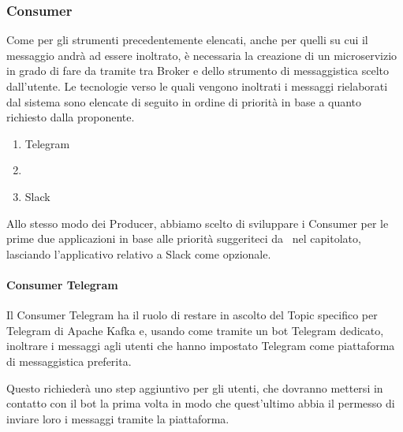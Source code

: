 
	\subsubsection{Consumer}\label{TecnologieConsumer}
		Come per gli strumenti precedentemente elencati, anche per quelli su cui il messaggio andrà ad essere inoltrato, è necessaria la creazione di un microservizio in grado di fare da tramite tra Broker e  dello strumento di messaggistica scelto dall'utente.
		Le tecnologie verso le quali vengono inoltrati i messaggi rielaborati dal sistema sono elencate di seguito in ordine di priorità in base a quanto richiesto dalla proponente.
		\begin{enumerate}
			\item Telegram
			\item \mail
			\item Slack
		\end{enumerate}
		Allo stesso modo dei Producer, abbiamo scelto di sviluppare i Consumer per le prime due applicazioni in base alle priorità suggeriteci da \II\ nel capitolato, lasciando l'applicativo relativo a Slack come opzionale.

		\paragraph{Consumer Telegram}
		Il Consumer Telegram ha il ruolo di restare in ascolto del Topic specifico
		per Telegram di Apache Kafka e, usando come tramite un bot Telegram dedicato, inoltrare i messaggi agli utenti che hanno impostato Telegram come piattaforma di
		messaggistica preferita.

		Questo richiederà uno step aggiuntivo per gli utenti, che dovranno mettersi
		in contatto con il bot la prima volta in modo che quest'ultimo abbia il permesso di inviare
		loro i messaggi tramite la piattaforma.

		
	
